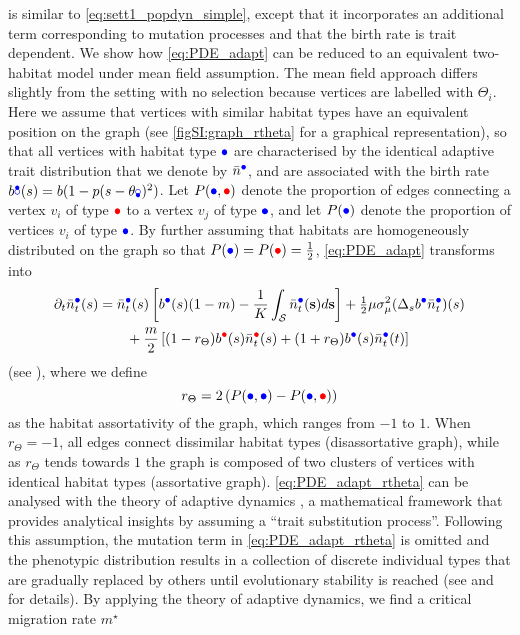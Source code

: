  is similar to \cref{eq:sett1_popdyn_simple}, except that it incorporates an additional term corresponding to mutation processes and that the birth rate is trait dependent.
%
We show how \cref{eq:PDE_adapt} can be reduced to an equivalent two-habitat model under mean field assumption. 
%
The mean field approach differs slightly from the setting with no selection because vertices are labelled with $\Theta_i$. Here we assume that vertices with similar habitat types have an equivalent position on the graph (see \cref{figSI:graph_rtheta} for a graphical representation), so that all vertices with habitat type $\bcirc$ are characterised by the identical adaptive trait distribution that we denote by $\bar{n}^{{\bcirc}}$, and are associated with the birth rate $b^\bcirc(s) = b(1 - p(s - \theta_\bcirc)^2)$. Let $P({\bcirc},{\rcirc})$ denote the proportion of edges connecting a vertex $v_i$ of type $\rcirc$ to a vertex $v_j$ of type $\bcirc$, and let $P(\bcirc)$ denote the proportion of vertices $v_i$ of type $\bcirc$. 
%
By further assuming that habitats are homogeneously distributed on the graph so that $P({\bcirc}) = P({\rcirc}) = \tfrac{1}{2}$, \cref{eq:PDE_adapt} transforms into
\begin{equation}\label{eq:PDE_adapt_rtheta}
  \begin{split}
    \partial_t \bar{n}_t^{{\bcirc}}(s) &= \bar{n}_t^{{\bcirc}}(s)\left[ b^{{\bcirc}}(s) (1-m) - \frac{1}{K}\int_\mathcal{S}  \bar{n}_t^{{\bcirc}}({\textbf s}) d{\textbf s} \right] + \tfrac{1}{2} \mu \sigma_\mu^2 (\Delta_s b^{{\bcirc}} \bar{n}_t^{{\bcirc}})(s) \\
    & \qquad + \frac{m}{2} \, [ (1-r_\Theta)  b^{{\rcirc}}(s) \bar{n}_t^{{\rcirc}}(s) + (1 + r_\Theta)  b^{{\bcirc}}(s) \bar{n}_t^{{\bcirc}}(t)]\\
  \end{split}
\end{equation}
%
(see ), where we define
\begin{equation}\label{eq:r_theta_mf}
  r_\Theta = 2 \left( P({\bcirc},{\bcirc}) - P({\bcirc},{\rcirc}) \right)
\end{equation} 
as the habitat assortativity of the graph, which ranges from $-1$ to $1$.
%
When $r_\Theta = -1$, all edges connect dissimilar habitat types (disassortative graph), while as $r_\Theta$ tends towards $1$ the graph is composed of two clusters of vertices with identical habitat types (assortative graph).
%
\cref{eq:PDE_adapt_rtheta} can be analysed with the theory of adaptive dynamics \cite{Meszena1997,Debarre2013,Mirrahimi2020}, a mathematical framework that provides analytical insights by assuming a “trait substitution process”. Following this assumption, the mutation term in \cref{eq:PDE_adapt_rtheta} is omitted and the phenotypic distribution results in a collection of discrete individual types that are gradually replaced by others until evolutionary stability is reached (see  and \cite{Meszena1997,Debarre2013,Mirrahimi2020} for details). By applying the theory of adaptive dynamics, we find a critical migration rate $m^\star$
